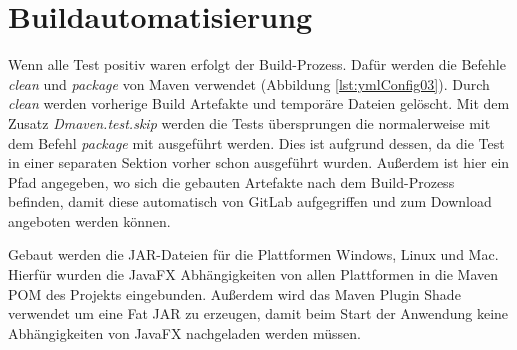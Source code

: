 \medskip
\begin{center}
	\begin{minipage}{0.7\textwidth}
		
	\end{minipage}
\end{center}

\section{Buildautomatisierung}

Wenn alle Test positiv waren erfolgt der Build-Prozess. Dafür werden die Befehle \textit{clean} und \textit{package} von Maven verwendet (Abbildung \ref{lst:ymlConfig03}). Durch \textit{clean} werden vorherige Build Artefakte und temporäre Dateien gelöscht. Mit dem Zusatz \textit{Dmaven.test.skip} werden die Tests übersprungen die normalerweise mit dem Befehl \textit{package} mit ausgeführt werden. Dies ist aufgrund dessen, da die Test in einer separaten Sektion vorher schon ausgeführt wurden. Außerdem ist hier ein Pfad angegeben, wo sich die gebauten Artefakte nach dem Build-Prozess befinden, damit diese automatisch von GitLab aufgegriffen und zum Download angeboten werden können.

\medskip
\begin{center}
	\begin{minipage}{0.7\textwidth}
		
	\end{minipage}
\end{center}

Gebaut werden die JAR-Dateien für die Plattformen Windows, Linux und Mac. Hierfür wurden die JavaFX Abhängigkeiten von allen Plattformen in die Maven POM des Projekts eingebunden. Außerdem wird das Maven Plugin Shade verwendet um eine Fat JAR zu erzeugen, damit beim Start der Anwendung keine Abhängigkeiten von JavaFX nachgeladen werden müssen.

\medskip
\begin{center}
	\begin{minipage}{0.8\textwidth}
		
	\end{minipage}
\end{center}